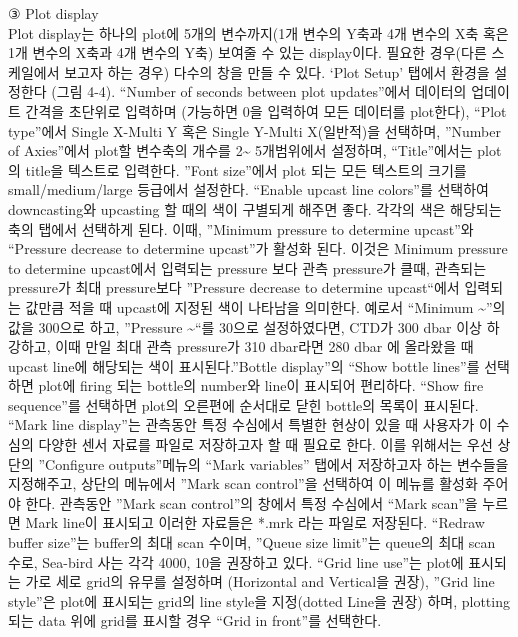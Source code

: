 \documentclass[
]{book}
\begin{document}
③ Plot display\\
Plot display는 하나의 plot에 5개의 변수까지(1개 변수의 Y축과 4개 변수의 X축 혹은 1개 변수의 X축과 4개 변수의 Y축) 보여줄 수 있는 display이다. 필요한 경우(다른 스케일에서 보고자 하는 경우) 다수의 창을 만들 수 있다. `Plot Setup' 탭에서 환경을 설정한다 (그림 4-4). ``Number of seconds between plot updates''에서 데이터의 업데이트 간격을 초단위로 입력하며 (가능하면 0을 입력하여 모든 데이터를 plot한다), ``Plot type''에서 Single X-Multi Y 혹은 Single Y-Multi X(일반적)을 선택하며, ''Number of Axies''에서 plot할 변수축의 개수를 2\textasciitilde{} 5개범위에서 설정하며, ``Title''에서는 plot 의 title을 텍스트로 입력한다. ''Font size''에서 plot 되는 모든 텍스트의 크기를 small/medium/large 등급에서 설정한다.
``Enable upcast line colors''를 선택하여 downcasting와 upcasting 할 때의 색이 구별되게 해주면 좋다. 각각의 색은 해당되는 축의 탭에서 선택하게 된다. 이때, ''Minimum pressure to determine upcast''와 ``Pressure decrease to determine upcast''가 활성화 된다. 이것은 Minimum pressure to determine upcast에서 입력되는 pressure 보다 관측 pressure가 클때, 관측되는 pressure가 최대 pressure보다 ''Pressure decrease to determine upcast``에서 입력되는 값만큼 적을 때 upcast에 지정된 색이 나타남을 의미한다. 예로서 ``Minimum \textasciitilde{}''의 값을 300으로 하고, ''Pressure \textasciitilde{}``를 30으로 설정하였다면, CTD가 300 dbar 이상 하강하고, 이때 만일 최대 관측 pressure가 310 dbar라면 280 dbar 에 올라왔을 때 upcast line에 해당되는 색이 표시된다.''Bottle display''의 ``Show bottle lines''를 선택하면 plot에 firing 되는 bottle의 number와 line이 표시되어 편리하다. ``Show fire sequence''를 선택하면 plot의 오른편에 순서대로 닫힌 bottle의 목록이 표시된다.
``Mark line display''는 관측동안 특정 수심에서 특별한 현상이 있을 때 사용자가 이 수심의 다양한 센서 자료를 파일로 저장하고자 할 때 필요로 한다. 이를 위해서는 우선 상단의 ''Configure outputs''메뉴의 ``Mark variables'' 탭에서 저장하고자 하는 변수들을 지정해주고, 상단의 메뉴에서 ''Mark scan control''을 선택하여 이 메뉴를 활성화 주어야 한다. 관측동안 ''Mark scan control''의 창에서 특정 수심에서 ``Mark scan''을 누르면 Mark line이 표시되고 이러한 자료들은 *.mrk 라는 파일로 저장된다.
``Redraw buffer size''는 buffer의 최대 scan 수이며, ''Queue size limit''는 queue의 최대 scan 수로, Sea-bird 사는 각각 4000, 10을 권장하고 있다.
``Grid line use''는 plot에 표시되는 가로 세로 grid의 유무를 설정하며 (Horizontal and Vertical을 권장), ''Grid line style''은 plot에 표시되는 grid의 line style을 지정(dotted Line을 권장) 하며, plotting 되는 data 위에 grid를 표시할 경우 ``Grid in front''를 선택한다.
\end{document}
